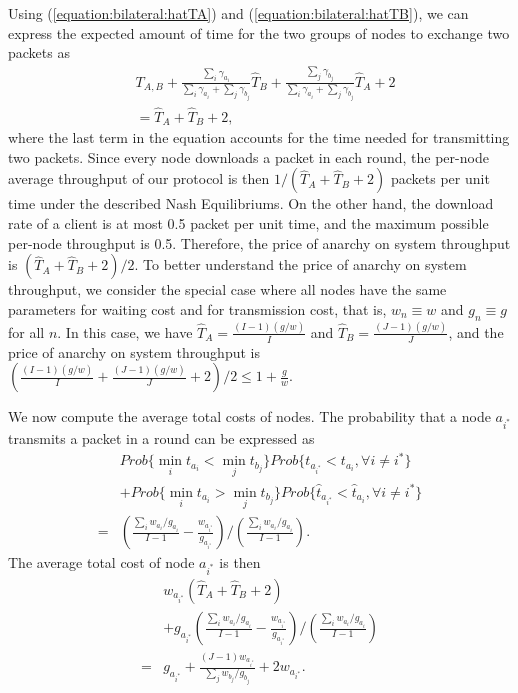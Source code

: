 \documentclass[11pt, conference]{IEEEtran}
\begin{document}
Using (\ref{equation:bilateral:hatTA}) and (\ref{equation:bilateral:hatTB}), we can express the expected amount of time for the two groups of nodes to exchange two packets as
\begin{align}
&T_{A,B}+\frac{\sum_i\gamma_{a_i}}{\sum_{i}\gamma_{a_i}+\sum_j\gamma_{b_j}}\hat{T}_B+\frac{\sum_j\gamma_{b_j}}{\sum_{i}\gamma_{a_i}+\sum_j\gamma_{b_j}}\hat{T}_A+2\nonumber\\
&=\hat{T}_A+\hat{T}_B+2,
\end{align}
where the last term in the equation accounts for the time needed for transmitting two packets. Since every node downloads a packet in each round, the per-node average throughput of our protocol is then $1/(\hat{T}_A+\hat{T}_B+2)$ packets per unit time under the described Nash Equilibriums. On the other hand, the download rate of a client is at most 0.5 packet per unit time, and the maximum possible per-node throughput is 0.5. Therefore, the price of anarchy on system throughput is $(\hat{T}_A+\hat{T}_B+2)/2$. To better understand the price of anarchy on system throughput, we consider the special case where all nodes have the same parameters for waiting cost and for transmission cost, that is, $w_n\equiv w$ and $g_n\equiv g$ for all $n$. In this case, we have $\hat{T}_A=\frac{(I-1)(g/w)}{I}$ and $\hat{T}_B=\frac{(J-1)(g/w)}{J}$, and the price of anarchy on system throughput is $(\frac{(I-1)(g/w)}{I}+\frac{(J-1)(g/w)}{J}+2)/2\leq 1+\frac{g}{w}$.

We now compute the average total costs of nodes. The probability that a node $a_{i^*}$ transmits a packet in a round can be expressed as
\begin{align*}
&Prob\{\min_it_{a_i}<\min_jt_{b_j}\}Prob\{t_{a_{i^*}}<t_{a_i},\forall i\neq i^*\}\\
&+Prob\{\min_it_{a_i}>\min_jt_{b_j}\}Prob\{\hat{t}_{a_{i^*}}<\hat{t}_{a_i},\forall i\neq i^*\}\\
=&(\frac{\sum_iw_{a_i}/g_{a_i}}{I-1}-\frac{w_{a_{i^*}}}{g_{a_{i^*}}})/(\frac{\sum_iw_{a_i}/g_{a_i}}{I-1}).
\end{align*}
The average total cost of node $a_{i^*}$ is then
\begin{align}
&w_{a_{i^*}}(\hat{T}_A+\hat{T}_B+2)\nonumber\\
&+g_{a_{i^*}}(\frac{\sum_iw_{a_i}/g_{a_i}}{I-1}-\frac{w_{a_{i^*}}}{g_{a_{i^*}}})/(\frac{\sum_iw_{a_i}/g_{a_i}}{I-1})\nonumber\\
=&g_{a_{i^*}}+\frac{(J-1)w_{a_{i^*}}}{\sum_jw_{b_j}/g_{b_j}}+2w_{a_{i^*}}.
\end{align}
\end{document}
